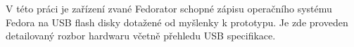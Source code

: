 V této práci je zařízení zvané Fedorator schopné zápisu operačního systému Fedora na USB flash disky dotažené od myšlenky k prototypu.  Je zde proveden detailovaný rozbor hardwaru včetně přehledu USB specifikace.
